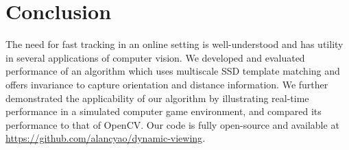 \documentclass[10pt,twocolumn,letterpaper]{article}
\begin{document}
\section*{Conclusion}
The need for fast tracking in an online setting is well-understood and has utility
in several applications of computer vision. We developed and evaluated performance
of an algorithm which uses multiscale SSD template matching and offers invariance to
capture orientation and distance information. We further demonstrated the applicability of our
algorithm by illustrating real-time performance in a simulated computer game environment,
and compared its performance to that of OpenCV. Our code is fully open-source and available
at \url{https://github.com/alancyao/dynamic-viewing}.

{\small


}
\end{document}
